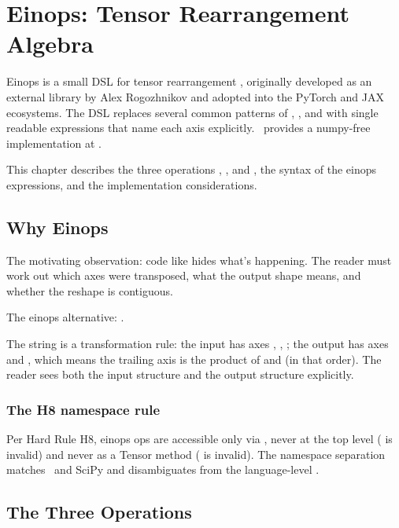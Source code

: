 \chapter{Einops: Tensor Rearrangement Algebra}
\label{ch:einops}

Einops is a small DSL for tensor rearrangement
\cite{einops_rogozhnikov}, originally developed as an external
library by Alex Rogozhnikov and adopted into the PyTorch and JAX
ecosystems. The DSL replaces several
common patterns of , , and
 with single readable expressions that name each axis
explicitly. \Lucid\ provides a numpy-free implementation at
.

This chapter describes the three operations ,
, and , the syntax of the einops
expressions, and the implementation considerations.

\section{Why Einops}
\label{sec:einops:why}

The motivating observation: code like
 hides what's happening.
The reader must work out which axes were transposed, what the
output shape means, and whether the reshape is contiguous.

The einops alternative:
.

The string is a transformation rule: the input has axes ,
, ; the output has axes  and , which means the trailing axis is the product of 
and  (in that order). The reader sees both the input
structure and the output structure explicitly.

\subsection{The H8 namespace rule}
\label{ssec:einops:h8}

Per Hard Rule H8, einops ops are accessible only via
, never at the top level
( is invalid) and never as a Tensor method
( is invalid). The namespace separation
matches \ and SciPy and disambiguates from the
language-level .

\section{The Three Operations}
\label{sec:einops:operations}

